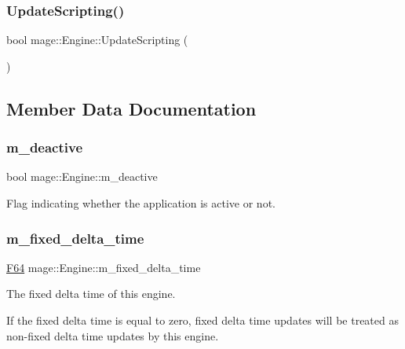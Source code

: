 \subsubsection{\texorpdfstring{Update\+Scripting()}{UpdateScripting()}}
{\footnotesize\ttfamily bool mage\+::\+Engine\+::\+Update\+Scripting (\begin{DoxyParamCaption}{ }\end{DoxyParamCaption})\hspace{0.3cm}{\ttfamily [private]}}



\subsection{Member Data Documentation}
\mbox{\label{classmage_1_1_engine_ab8a4b0157403708ae7d1d018a95b4c63}} 
\subsubsection{\texorpdfstring{m\+\_\+deactive}{m\_deactive}}
{\footnotesize\ttfamily bool mage\+::\+Engine\+::m\+\_\+deactive\hspace{0.3cm}{\ttfamily [private]}}

Flag indicating whether the application is active or not. \mbox{\label{classmage_1_1_engine_a95557e1b6cba52b393c94d80d80bea4c}} 
\subsubsection{\texorpdfstring{m\+\_\+fixed\+\_\+delta\+\_\+time}{m\_fixed\_delta\_time}}
{\footnotesize\ttfamily \mbox{\hyperlink{namespacemage_ad26233bbec640deda836e572c1a23708}{F64}} mage\+::\+Engine\+::m\+\_\+fixed\+\_\+delta\+\_\+time\hspace{0.3cm}{\ttfamily [private]}}

The fixed delta time of this engine.

If the fixed delta time is equal to zero, fixed delta time updates will be treated as non-\/fixed delta time updates by this engine. \mbox{\label{classmage_1_1_engine_ad46dd72279d9d86b96d1b907575765e9}} 
